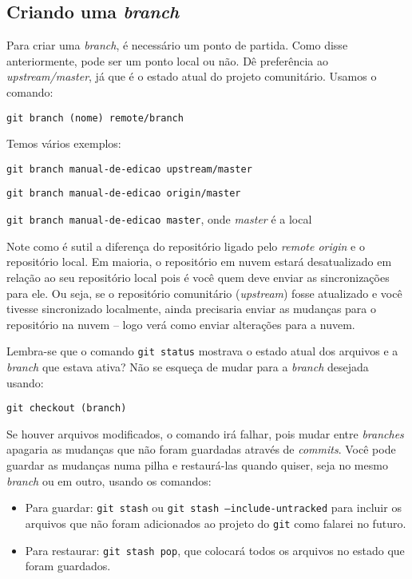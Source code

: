 \documentclass[a4paper,oneside,10pt]{memoir}
\begin{document}
\subsection{Criando uma \emph{branch}}

Para criar uma \emph{branch}, é necessário um ponto de partida. Como disse
anteriormente, pode ser um ponto local ou não. Dê preferência ao
\emph{upstream/master}, já que é o estado atual do projeto comunitário. Usamos
o comando:

\begin{center}
\texttt{git branch (nome) remote/branch}
\end{center}

Temos vários exemplos:

\begin{center}
\texttt{git branch manual-de-edicao upstream/master}

\texttt{git branch manual-de-edicao origin/master}

\texttt{git branch manual-de-edicao master}, onde \emph{master} é a local
\end{center}

Note como é sutil a diferença do repositório ligado pelo \emph{remote origin} e
o repositório local. Em maioria, o repositório em nuvem estará desatualizado em
relação ao seu repositório local pois é você quem deve enviar as sincronizações
para ele. Ou seja, se o repositório comunitário (\emph{upstream}) fosse
atualizado e você tivesse sincronizado localmente, ainda precisaria enviar as
mudanças para o repositório na nuvem -- logo verá como enviar alterações para
a nuvem.

Lembra-se que o comando \texttt{git status} mostrava o estado atual dos
arquivos e a \emph{branch} que estava ativa? Não se esqueça de mudar para a
\emph{branch} desejada usando:

\begin{center}
\texttt{git checkout (branch)}
\end{center}

Se houver arquivos modificados, o comando irá falhar, pois mudar entre
\emph{branches} apagaria as mudanças que não foram guardadas através de
\emph{commits}. Você pode guardar as mudanças numa pilha e restaurá-las quando
quiser, seja no mesmo \emph{branch} ou em outro, usando os comandos:

\begin{itemize}
\item Para guardar: \texttt{git stash} ou \texttt{git stash
  --include-untracked} para incluir os arquivos que não foram adicionados ao
  projeto do \texttt{git} como falarei no futuro.
\item Para restaurar: \texttt{git stash pop}, que colocará todos os arquivos
  no estado que foram guardados.
\end{itemize}
\end{document}
